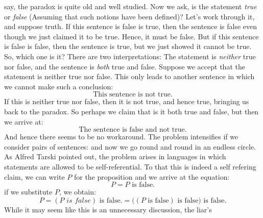         say, the paradox is quite old and well studied. Now we ask, is the
        statement \textit{true} or \textit{false} (Assuming that such notions
        have been defined)? Let's work through it, and suppose truth. If
        this sentence is false is true, then the sentence is false even though
        we just claimed it to be true. Hence, it must be false. But if this
        sentence is false is false, then the sentence is true, but we just
        showed it cannot be true. So, which one is it? There are two
        interpretations: The statement is \textit{neither} true nor false, and
        the sentence is \textit{both} true and false. Suppose we accept that the
        statement is neither true nor false. This only leads to another
        sentence in which we cannot make such a conclusion:
        \begin{equation}
            \text{This sentence is not true.}
        \end{equation}
        If this is neither true nor false, then it is not true, and hence true,
        bringing us back to the paradox. So perhaps we claim that is it both
        true and false, but then we arrive at:
        \begin{equation}
            \text{The sentence is false and not true.}
        \end{equation}
        And hence there seems to be no workaround. The problem intensifies if we
        consider pairs of sentences:
        {%
            \label{eqn:That_Statement_Is_False}%
        }
        and now we go round and round in an endless circle. As Alfred Tarski
        pointed out, the problem arises in languages in which statements are
        allowed to be self-referential. To that this is indeed a self refering
        claim, we can write $P$ for the proposition and we arrive at the
        equation:
        \begin{equation}
            P=P\text{ is false.}
        \end{equation}
        if we substitute $P$, we obtain:
        \begin{equation}
            P=(P\textit{ is false})\text{ is false.}
             =\big((P\text{ is false})\text{ is false}\big)\text{ is false.}
        \end{equation}
        While it may seem like this is an unnecessary discussion, the liar's
